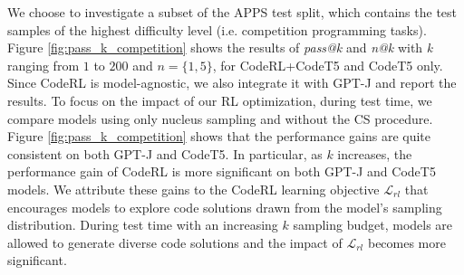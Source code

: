 \documentclass{article}
\begin{document}
We choose to investigate a subset of the APPS test split, which contains the test samples of the highest difficulty level (i.e. competition programming tasks). 
Figure \ref{fig:pass_k_competition} shows the results of \emph{pass@k} and \emph{n@k} with \emph{k} ranging from $1$ to $200$ and $n=\{1,5\}$, for CodeRL+CodeT5 and CodeT5 only.
Since CodeRL is model-agnostic, we also integrate it with GPT-J \citep{gpt-j} and report the results. 
To focus on the impact of our RL optimization, during test time, we compare models using only nucleus sampling and without the CS procedure. 
Figure \ref{fig:pass_k_competition} shows that the performance gains are quite consistent on both GPT-J and CodeT5. 
In particular, as $k$ increases, the performance gain of CodeRL is more significant on both GPT-J and CodeT5 models.
We attribute these gains to the CodeRL learning objective $\mathcal{L}_{rl}$ that encourages models to explore code solutions drawn from the model's sampling distribution. 
During test time with an increasing $k$ sampling budget, models are allowed to generate diverse code solutions and the impact of $\mathcal{L}_{rl}$ becomes more significant. 
\end{document}
